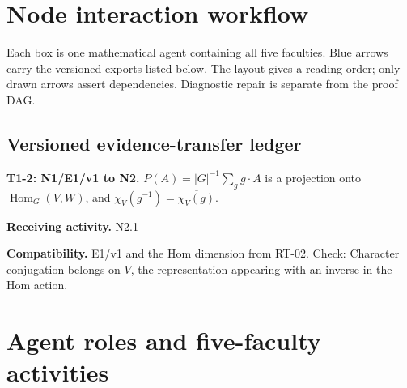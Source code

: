 \documentclass[preprint,12pt,aps,pra,showkeys,amsmath,amssymb,superscriptaddress,floatfix]{revtex4-2}
\theoremstyle{definition}
\theoremstyle{remark}
\newcommand{\field}[2]{\par\smallskip\noindent\textbf{#1.} #2\par}
\begin{document}
\clearpage\section{Node interaction workflow}

\begin{center}\end{center}

Each box is one mathematical agent containing all five faculties. Blue
arrows carry the versioned exports listed below. The layout gives a
reading order; only drawn arrows assert dependencies. Diagnostic repair
is separate from the proof DAG.

\subsection{Versioned evidence-transfer ledger}

\begingroup\small\linespread{1.05}\selectfont

\field{T1-2: N1/E1/v1 to N2}{\(P(A)=|G|^{-1}\sum_g g\cdot A\) is a projection onto
\(\operatorname{Hom}_G(V,W)\), and
\(\chi_V(g^{-1})=\overline{\chi_V(g)}\).}

\field{Receiving activity}{N2.1}

\field{Compatibility}{E1/v1 and the Hom dimension from RT-02. Check: Character conjugation
belongs on \(V\), the representation appearing with an inverse in the
Hom action.}

\endgroup

\clearpage\section{Agent roles and five-faculty activities}\begingroup\small\linespread{1.05}\selectfont{}
\end{document}
